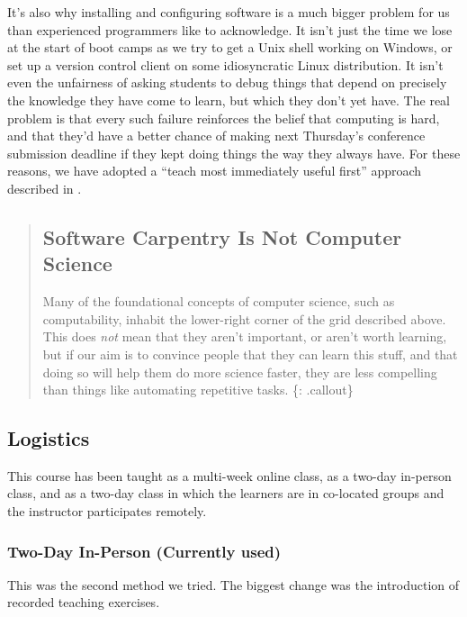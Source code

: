 It's also why installing and configuring software is a much bigger
problem for us than experienced programmers like to acknowledge. It
isn't just the time we lose at the start of boot camps as we try to get
a Unix shell working on Windows, or set up a version control client on
some idiosyncratic Linux distribution. It isn't even the unfairness of
asking students to debug things that depend on precisely the knowledge
they have come to learn, but which they don't yet have. The real problem
is that every such failure reinforces the belief that computing is hard,
and that they'd have a better chance of making next Thursday's
conference submission deadline if they kept doing things the way they
always have. For these reasons, we have adopted a ``teach most
immediately useful first'' approach described in .

\begin{quote}
\subsection{Software Carpentry Is Not Computer
Science}\label{software-carpentry-is-not-computer-science}

Many of the foundational concepts of computer science, such as
computability, inhabit the lower-right corner of the grid described
above. This does \emph{not} mean that they aren't important, or aren't
worth learning, but if our aim is to convince people that they can learn
this stuff, and that doing so will help them do more science faster,
they are less compelling than things like automating repetitive tasks.
\{: .callout\}
\end{quote}

\subsection{Logistics}\label{logistics}

This course has been taught as a multi-week online class, as a two-day
in-person class, and as a two-day class in which the learners are in
co-located groups and the instructor participates remotely.

\subsubsection{Two-Day In-Person (Currently
used)}\label{two-day-in-person-currently-used}

This was the second method we tried. The biggest change was the
introduction of recorded teaching exercises.

